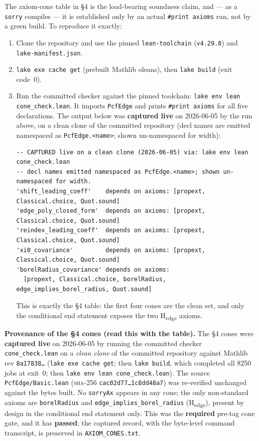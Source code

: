 \documentclass[11pt]{article}
\newcommand{\Hedge}{\textsf{H\textsubscript{edge}}}
\begin{document}
The axiom-cone table in \S4 is the load-bearing soundness claim, and --- as a
\texttt{sorry} compiles --- it is established only by an actual
\texttt{\#print axioms} run, not by a green build. To reproduce it exactly:
\begin{enumerate}\setlength\itemsep{2pt}
  \item Clone the repository and use the pinned \texttt{lean-toolchain}
        (\texttt{v4.29.0}) and \texttt{lake-manifest.json}.
  \item \texttt{lake exe cache get} (prebuilt Mathlib oleans), then
        \texttt{lake build} (exit code~0).
  \item Run the committed checker against the pinned toolchain:
        \texttt{lake env lean cone\_check.lean}. It imports \texttt{PcfEdge} and
        prints \texttt{\#print axioms} for all five declarations. The output
        below was \textbf{captured live} on 2026-06-05 by the run above, on a
        clean clone of the committed repository (decl names are emitted
        namespaced as \texttt{PcfEdge.<name>}; shown un-namespaced for width):
\begin{lstlisting}
-- CAPTURED live on a clean clone (2026-06-05) via: lake env lean cone_check.lean
-- decl names emitted namespaced as PcfEdge.<name>; shown un-namespaced for width.
'shift_leading_coeff'    depends on axioms: [propext, Classical.choice, Quot.sound]
'edge_poly_closed_form'  depends on axioms: [propext, Classical.choice, Quot.sound]
'reindex_leading_coeff'  depends on axioms: [propext, Classical.choice, Quot.sound]
'xi0_covariance'         depends on axioms: [propext, Classical.choice, Quot.sound]
'borelRadius_covariance' depends on axioms:
  [propext, Classical.choice, borelRadius, edge_implies_borel_radius, Quot.sound]
\end{lstlisting}
        This is exactly the \S4 table: the first four cones are the
        clean set, and only the conditional end statement exposes the two
        \Hedge{} axioms.
\end{enumerate}
\textbf{Provenance of the \S4 cones (read this with the table).} The \S4 cones
were \textbf{captured live} on 2026-06-05 by running the committed checker
\texttt{cone\_check.lean} on a \emph{clean clone} of the committed repository
against Mathlib rev \texttt{8a17838\ldots} (\texttt{lake exe cache get}; then
\texttt{lake build}, which completed all 8250 jobs at exit~0; then
\texttt{lake env lean cone\_check.lean}). The source \texttt{PcfEdge/Basic.lean}
(\textsc{sha-256} \texttt{cac02d77\ldots1c8dd48a7}) was re-verified unchanged
against the bytes built. No \texttt{sorryAx} appears in any cone; the only
non-standard axioms are \texttt{borelRadius} and
\texttt{edge\_implies\_borel\_radius} (\Hedge), present by design in the
conditional end statement only. This was the \textbf{required} pre-tag cone
gate, and it has \textbf{passed}; the captured record, with the byte-level
command transcript, is preserved in \texttt{AXIOM\_CONES.txt}.
\end{document}
